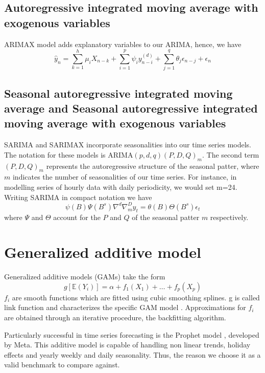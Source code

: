 \subsection{Autoregressive integrated moving average with exogenous variables}
ARIMAX model adds explanatory variables to our ARIMA, hence, we have
\begin{equation}
    \hat{y}_n=\sum\limits_{k=1}^{h} \mu_i X_{n-k}+\sum\limits_{i=1}^{p}\psi_i y_{n-i}^{(d)}+\sum\limits_{j=1}^{q}\theta_j \epsilon_{n-j}+ \epsilon_{n}
\end{equation}
\subsection{Seasonal autoregressive integrated moving average and Seasonal autoregressive integrated moving average with exogenous variables}
SARIMA and SARIMAX incorporate seasonalities into our time series models. The notation for these models is ARIMA$(p,d,q)(P,D,Q)_m$. The second term $(P,D,Q)_m$ represents the autoregressive structure of the seasonal patter, where $m$ indicates the number of seasonalities of our time series.
For instance, in modelling series of hourly data with daily periodicity, we would set m=24.
Writing SARIMA in compact notation we have
\\
\begin{equation}
    \psi(B)\Psi(B^s)\nabla^d\nabla_m^Dy_t=\theta(B)\Theta(B^s)\epsilon_t
\end{equation}
where $\Psi$ and $\Theta$ account for the $P$ and $Q$ of the seasonal patter $m$ respectively.
\section{Generalized additive model}
Generalized additive models (GAMs) take the form
\begin{equation}
    g[\mathbb{E}(Y_i)]=\alpha+f_1(X_1)+\dots+f_p(X_p)
\end{equation}
$f_i$ are smooth functions which are fitted using cubic smoothing splines.
g is called link function and characterizes the specific GAM model \cite{hastie2017generalized}. Approximations for $f_i$ are obtained through an iterative procedure, the backfitting algorithm.

Particularly successful in time series forecasting is the Prophet model \cite{taylor2018forecasting}, developed by Meta. This additive model is capable of handling non linear trends, holiday effects and yearly weekly and daily seasonality. Thus, the reason we choose it as a valid benchmark to compare against.
